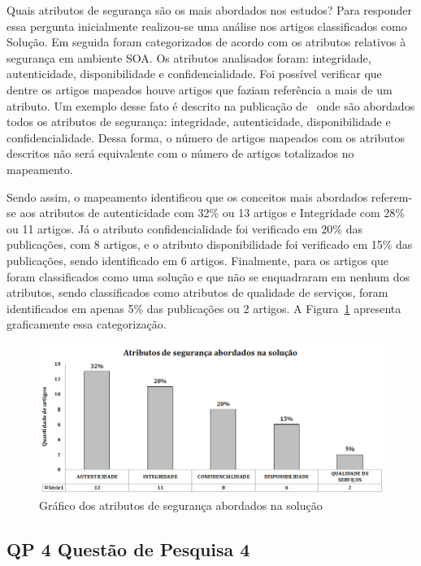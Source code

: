 Quais atributos de segurança são os mais abordados nos estudos?
Para responder essa pergunta inicialmente realizou-se uma análise nos artigos classificados como Solução. Em seguida foram categorizados de acordo com os atributos relativos à segurança em ambiente SOA. Os atributos analisados foram: integridade, autenticidade, disponibilidade e confidencialidade. Foi possível verificar que dentre os artigos mapeados houve artigos que faziam referência a mais de um atributo. Um exemplo desse fato é descrito na publicação de~\cite{pattern-driven2008} onde são abordados todos os atributos de segurança: integridade, autenticidade, disponibilidade e confidencialidade. Dessa forma, o número de artigos mapeados com os atributos descritos não será equivalente com o número de artigos totalizados no mapeamento.

Sendo assim, o mapeamento identificou que os conceitos mais abordados referem-se aos atributos de autenticidade com 32\% ou 13 artigos e Integridade com 28\% ou 11 artigos. Já o atributo confidencialidade foi verificado em 20\% das publicações, com 8 artigos, e o atributo disponibilidade foi verificado em 15\% das publicações, sendo identificado em 6 artigos. Finalmente, para os artigos que foram classificados como uma solução e que não se enquadraram em nenhum dos atributos, sendo classificados como atributos de qualidade de serviços, foram identificados em apenas 5\% das publicações ou 2 artigos. A Figura~\ref{fig:TipoConceito} apresenta graficamente essa categorização.

\begin{figure}[!htb]
\centering
\includegraphics[width=1.0\textwidth]{Atributo_Seguranca_Solucao.png}
\caption{Gráfico dos atributos de segurança abordados na solução}
\label{fig:TipoConceito}
\end{figure}

\subsection{QP 4 \- Questão de Pesquisa 4}

